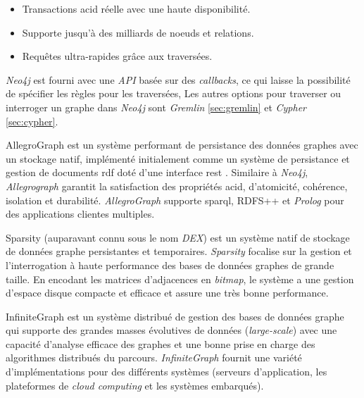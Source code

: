     \begin{itemize}\renewcommand\labelitemi{--}
    \item Transactions \acrshort{acid} réelle avec une haute disponibilité.
    \item Supporte jusqu'à des milliards de noeuds et relations.
    \item Requêtes ultra-rapides grâce aux traversées.
    \end{itemize}
    \enddescription
    \medskip

    \textit{Neo4j} est fourni avec une \textit{API} basée sur des
    \textit{callbacks}, ce qui laisse la possibilité de spécifier
    les règles pour les traversées, Les autres options pour traverser
    ou interroger un graphe dans \textit{Neo4j} sont \textit{Gremlin}
    \ref{sec:gremlin} et \textit{Cypher} \ref{sec:cypher}.\bigskip

    \textsf{AllegroGraph} \cite{allegrograph} est un système performant
    de persistance des données graphes avec un stockage natif,
    implémenté initialement comme un système de persistance et
    gestion de documents \acrshort{rdf} doté d'une interface
    \acrshort{rest} \cite{fielding2000architectural}. Similaire à
    \emph{Neo4j}, \emph{Allegrograph} garantit la satisfaction des
    propriétés \acrshort{acid},  d'atomicité, cohérence, isolation et
    durabilité. \emph{AllegroGraph} supporte \acrshort{sparql}, RDFS++
    et \textit{Prolog} pour des applications clientes
    multiples.\bigskip

    \textsf{Sparsity} \cite{sparksee} (auparavant connu sous le nom
    \emph{DEX}) est un système natif de stockage de données graphe
    persistantes et temporaires. \emph{Sparsity} focalise sur la
    gestion et l'interrogation à haute performance des bases de 
    données graphes de grande taille. En encodant les matrices d'adjacences en
    \emph{bitmap}, le système a une gestion d'espace disque compacte et
    efficace et assure une très bonne performance.\medskip
    \newpage

    \textsf{InfiniteGraph} \cite{infinitegraph} est un système
    distribué de gestion des bases de données graphe qui supporte des
    grandes masses évolutives de données (\emph{large-scale}) avec une
    capacité d'analyse efficace des graphes et une bonne prise en
    charge des algorithmes distribués du
    parcours. \emph{InfiniteGraph} fournit une variété
    d'implémentations pour des différents systèmes (serveurs
    d'application, les plateformes de \emph{cloud computing} et les
    systèmes embarqués).

